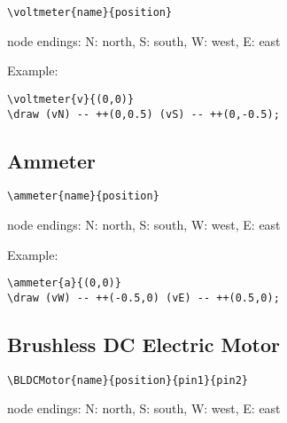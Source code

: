 \documentclass[parskip=full]{scrartcl}
\begin{document}
\begin{verbatim}
\voltmeter{name}{position}
\end{verbatim}
node endings: N: north, S: south, W: west, E: east

Example:\\
\begin{minipage}{0.8\textwidth}
\begin{verbatim}
\voltmeter{v}{(0,0)}
\draw (vN) -- ++(0,0.5) (vS) -- ++(0,-0.5);
\end{verbatim}
\end{minipage}
\begin{minipage}{0.19\textwidth}
\end{minipage}

\subsection{Ammeter}

\begin{verbatim}
\ammeter{name}{position}
\end{verbatim}
node endings: N: north, S: south, W: west, E: east

Example:\\
\begin{minipage}{0.8\textwidth}
\begin{verbatim}
\ammeter{a}{(0,0)}
\draw (vW) -- ++(-0.5,0) (vE) -- ++(0.5,0);
\end{verbatim}
\end{minipage}
\begin{minipage}{0.19\textwidth}
\end{minipage}

\subsection{Brushless DC Electric Motor}

\begin{verbatim}
\BLDCMotor{name}{position}{pin1}{pin2}
\end{verbatim}
node endings: N: north, S: south, W: west, E: east
\end{document}
